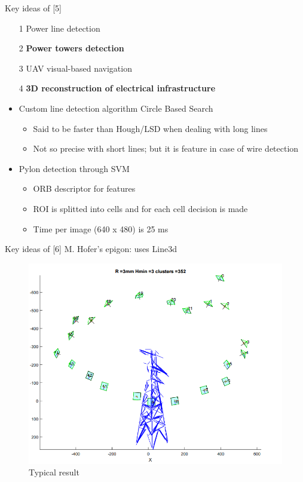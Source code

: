 \documentclass{beamer}
\begin{document}
\begin{frame}[t, fragile]{Key ideas of [5]}
\begin{itemize}
\item [1] Power line detection
\item [2] \textbf{Power towers detection}
\item [3] UAV visual-based navigation
\item [4] \textbf{3D reconstruction of electrical infrastructure}
\end{itemize}

\begin{itemize}
\item Custom line detection algorithm Circle Based Search
\begin{itemize}
\item Said to be faster than Hough/LSD when dealing with long lines
\item Not so precise with short lines; but it is feature in case of wire detection
\end{itemize}
\item Pylon detection through SVM
\begin{itemize}
\item ORB descriptor for features
\item ROI is splitted into cells and for each cell decision is made
\item Time per image (640 x 480) is 25 ms 
\end{itemize}
\end{itemize}
\end{frame}

\begin{frame}[t, fragile]{Key ideas of [6]}
M. Hofer's epigon: uses Line3d

\begin{figure}
\centering
\includegraphics[scale=0.25]{morrarjee}
\captionsetup{labelformat=empty}
\caption{Typical result}
\end{figure}
\end{frame}
\end{document}
